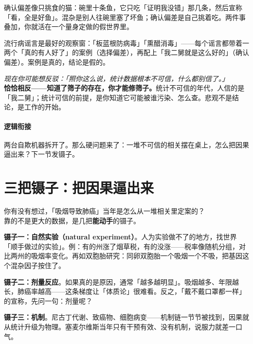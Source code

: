 \documentclass[../../main2.tex]{subfiles}
\begin{document}
\begin{tcolorbox}[colback=green!5, title=\textit{生活类比}]
	确认偏差像只挑食的猫：碗里十条鱼，它只吃「证明我没错」那几条，然后宣称「看，全是好鱼」。混杂是别人往碗里塞了坏鱼；确认偏差是自己挑着吃。两件事叠加，你就活在一个量身定做的假世界里。
\end{tcolorbox}

流行病谣言是最好的观察窗：「板蓝根防病毒」「熏醋消毒」——每个谣言都带着一两个「真的有人好了」的案例（选择偏差），再配上「我二舅就是这么好的」（确认偏差）。案例是真的，结论是假的。

\begin{questionbox}
	\textit{现在你可能想反驳：「照你这么说，统计数据根本不可信，什么都别信了。」}\\
	\textbf{恰恰相反——知道了筛子的存在，你才能修筛子。}统计不可信的年代，人信的是「我二舅」；统计可信的前提，是你知道它可能被谁污染、怎么查。悲观不是结论，是工作的开始。
\end{questionbox}

\paragraph*{逻辑衔接}
	两台自欺机器拆开了。那么硬问题来了：一堆不可信的相关摆在桌上，怎么把因果逼出来？下一节发镊子。

\section{三把镊子：把因果逼出来}

\begin{readingnote}
	你有没有想过，「吸烟导致肺癌」当年是怎么从一堆相关里定案的？\\
	靠的不是更大的数据，是几把\textbf{能动手}的镊子。
\end{readingnote}

\textbf{镊子一：自然实验（natural experiment）}。人为实验做不了的地方，找世界「顺手做过的实验」。例：有的州涨了烟草税，有的没涨——税率像随机分组，对比两州的吸烟率变化。再如双胞胎研究：同卵双胞胎一个吸烟一个不吸，把基因这个混杂因子按住了。

\textbf{镊子二：剂量反应}。如果真的是原因，通常「越多越明显」。吸烟越多、年限越长，肺癌率越高——这条梯度让「体质论」很难看。反之，「戴不戴口罩都一样」的宣称，先问一句：剂量呢？

\textbf{镊子三：机制}。尼古丁代谢、致癌物、细胞病变——机制链一节节被找到，因果就从统计升级为物理。塞麦尔维斯当年只有干预有效、没有机制，说服力就差一口气。
\end{document}
